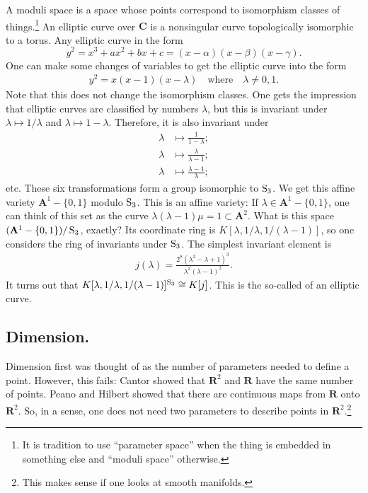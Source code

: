 \documentclass [11 pt, oneside] {article}
\begin{document}
\fi
\begin{example}\label{}
A moduli space is a space whose points correspond to isomorphism classes of things.\footnote{It is tradition to use ``parameter space'' when the thing is embedded in something else and ``moduli space'' otherwise.} An elliptic curve over $\mathbf{C}$ is a nonsingular curve topologically isomorphic to a torus. Any elliptic curve in the form 
\[ 
	y^2=x^3+ax^2+bx+c = (x-\alpha) (x-\beta) (x-\gamma).
\] 
One can make some changes of variables to get the elliptic curve into the form
\begin{align*}
	y^2 = x(x-1) (x-\lambda)\quad\textrm{where}\quad \lambda \ne 0,1.
\end{align*}
Note that this does not change the isomorphism classes. One gets the impression that elliptic curves are classified by numbers $\lambda$, but this is invariant under $\lambda\longmapsto 1/\lambda$ and $\lambda \longmapsto 1-\lambda$. Therefore, it is also invariant under
\begin{align*}
	\lambda &\longmapsto \frac{1}{1-\lambda};\\
	\lambda&\longmapsto \frac{\lambda}{\lambda-1};\\
	\lambda&\longmapsto \frac{\lambda-1}{\lambda};
\end{align*}
etc. These six transformations form a group isomorphic to $\operatorname{S}_3$. We get this affine variety $\mathbf{A}^1 - \{0,1\}$ modulo $\operatorname{S}_3$. This is an affine variety: If $\lambda\in \mathbf{A}^1-\{0,1\}$, one can think of this set as the curve $\lambda(\lambda-1)\mu = 1\subset\mathbf{A}^2$. What is this space $(\mathbf{A}^1 - \{0,1\}) / \operatorname{S}_3$, exactly? Its coordinate ring is $K[\lambda, 1/\lambda, 1/(\lambda-1)]$, so one considers the ring of invariants under $\operatorname{S}_3$. The simplest invariant element is 
\begin{align*}
	j(\lambda) =  \frac{2^8(\lambda^2-\lambda+1)^3}{\lambda^2(\lambda-1)^2}.
\end{align*}
It turns out that $K[\lambda, 1/\lambda, 1/(\lambda-1)]^{\operatorname{S}_3} \cong K[j]$. This is the so-called  of an elliptic curve.
\end{example}


\subsection{Dimension.}
Dimension first was thought of as the number of parameters needed to define a point. However, this fails: Cantor showed that $\mathbf{R}^2$ and $\mathbf{R}$ have the same number of points. Peano and Hilbert showed that there are continuous maps from $\mathbf{R}$ onto $\mathbf{R}^2$. So, in a sense, one does not need two parameters to describe points in $\mathbf{R}^2$.\footnote{This makes sense if one looks at smooth manifolds.}
\end{document}
